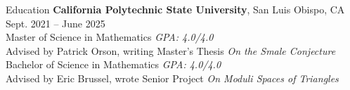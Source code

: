 \documentclass[
	11pt, %
]{cv} %
\begin{document}
\begin{rSection}{Education}
	\textbf{California Polytechnic State University}, San Luis Obispo, CA \hfill Sept. 2021 -- June 2025 \\
	Master of Science in  Mathematics \hfill \textit{GPA: 4.0/4.0} \\
	\-\hspace{1cm}Advised by Patrick Orson, writing Master's Thesis \textit{On the Smale Conjecture}\\
	Bachelor of Science in Mathematics \hfill \textit{GPA: 4.0/4.0} \\
	\-\hspace{1cm}Advised by Eric Brussel, wrote Senior Project \textit{On Moduli Spaces of Triangles}
\end{rSection}
\end{document}
